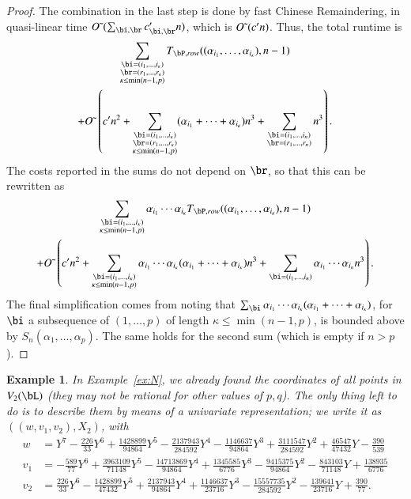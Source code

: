 \documentclass[amsthm]{elsart}
\newtheorem{example}[definition]{Example}
\begin{document}
\begin{proof}
  The combination in the last step is done by fast Chinese Remaindering,
  in quasi-linear time $\softO(\sum_{\bi,\br} c'_{\bi,\br}  n)$,
  which is ${O}{\,\tilde{ }\,}({c'}{} n)$. Thus, the total runtime is 
  \begin{multline*}
 \sum_{\substack{\bi=(i_1,\dots,i_\kappa)\\ \br=(r_1,\dots,r_\kappa)\\\kappa\le\min(n-1,p)}}
T_{\bP,{\rm row}}((\alpha_{i_1},\dots,\alpha_{i_\kappa}), n-1)\\
+\softO\left (\rc n^2  + \sum_{\substack{\bi=(i_1,\dots,i_\kappa)\\ \br=(r_1,\dots,r_\kappa)\\\kappa\le\min(n-1,p)}}
  (\alpha_{i_1} + \cdots +\alpha_{i_\kappa}) n^3 
  +  \sum_{\substack{\bi=(i_1,\dots,i_n)\\ \br=(r_1,\dots,r_n)}} n^3\right).    
  \end{multline*}
  The costs reported in the sums do not depend on $\br$, so that 
  this can be rewritten as 
  \begin{multline*}
 \sum_{\substack{\bi=(i_1,\dots,i_\kappa)\\ \kappa\le\min(n-1,p)}}
  \alpha_{i_1}  \cdots \alpha_{i_\kappa}T_{\bP,{\rm row}}((\alpha_{i_1},\dots,\alpha_{i_\kappa}), n-1)\\
+\softO\left ( \rc n^2 + \sum_{\substack{\bi=(i_1,\dots,i_\kappa)\\ \kappa\le\min(n-1,p)}}
    \alpha_{i_1}  \cdots \alpha_{i_\kappa} (\alpha_{i_1} + \cdots +\alpha_{i_\kappa}) n^3 
  +  \sum_{\substack{\bi=(i_1,\dots,i_n)}   }\alpha_{i_1}  \cdots \alpha_{i_n} n^3\right).    
  \end{multline*}
  The final simplification comes from noting that $\sum_{\bi}
  \alpha_{i_1} \cdots \alpha_{i_\kappa}(\alpha_{i_1} + \cdots
  +\alpha_{i_\kappa})$, for $\bi$ a subsequence of $(1,\dots,p)$ of
  length $\kappa\le\min(n-1,p)$, is bounded  above by
  $S_n(\alpha_1,\dots,\alpha_p)$. The same holds for the second
  sum (which is empty if $n >p$).
\end{proof}


\begin{example}\label{ex:Npar}
  In Example~\ref{ex:N}, we already found the coordinates of all
  points in $V_2(\bL)$ (they may not be rational for other values of
  $p,q$).  The only thing left to do is to describe them by means of a
  univariate representation; we write it as $((w,v_1,v_2),X_2)$, with
{\small  \begin{align*}
w &=Y^7 - \frac{226}{33}Y^6 + \frac{1428899}{94864}Y^5 - \frac{2137943}{284592}Y^4 - \frac{1146637}{94864}Y^3 + 
    \frac{3111547}{284592}Y^2 + \frac{46547}{47432}Y - \frac{390}{539} \\[1mm]
v_1&= -\frac{589}{77}Y^6 + \frac{3963109}{71148}Y^5 - \frac{14713869}{94864}Y^4 + \frac{1345585}{6776}Y^3 - 
    \frac{9415375}{94864}Y^2 - \frac{843103}{71148}Y + \frac{138935}{6776}\\[1mm]
v_2 &=\frac{226}{33}Y^6 - \frac{1428899}{47432}Y^5 + \frac{2137943}{94864}Y^4 + \frac{1146637}{23716}Y^3 - 
\frac{15557735}{284592}Y^2 - \frac{139641}{23716}Y + \frac{390}{77}.
  \end{align*}}
\end{example}
\end{document}
